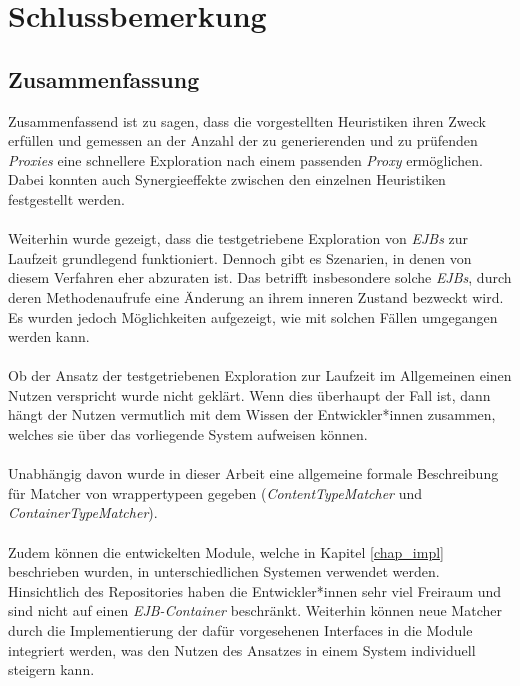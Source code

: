 \chapter{Schlussbemerkung}\label{chap_finish}
\section{Zusammenfassung}
Zusammenfassend ist zu sagen, dass die vorgestellten \Gls{Heuristik}en ihren Zweck erfüllen und gemessen an der Anzahl der zu generierenden und zu prüfenden \emph{Proxies} eine schnellere Exploration nach einem passenden \emph{Proxy} ermöglichen. Dabei konnten auch Synergieeffekte zwischen den einzelnen \Gls{Heuristik}en festgestellt werden.
\\\\
Weiterhin wurde gezeigt, dass die testgetriebene Exploration von \emph{EJBs} zur Laufzeit grundlegend funktioniert. Dennoch gibt es Szenarien, in denen von diesem Verfahren eher abzuraten ist. Das betrifft insbesondere solche \emph{EJBs}, durch deren Methodenaufrufe eine Änderung an ihrem inneren Zustand bezweckt wird. Es wurden jedoch Möglichkeiten aufgezeigt, wie mit solchen Fällen umgegangen werden kann.
\\\\
Ob der Ansatz der testgetriebenen Exploration zur Laufzeit im Allgemeinen einen Nutzen verspricht wurde nicht geklärt. Wenn dies überhaupt der Fall ist, dann hängt der Nutzen vermutlich mit dem Wissen der Entwickler*innen zusammen, welches sie über das vorliegende System aufweisen können.
\\\\
Unabhängig davon wurde in dieser Arbeit eine allgemeine formale Beschreibung für Matcher von \Gls{wrappertype}en gegeben (\emph{ContentTypeMatcher} und \emph{ContainerTypeMatcher}). 
\\\\
Zudem können die entwickelten \Gls{Modul}e, welche in Kapitel \ref{chap_impl} beschrieben wurden, in unterschiedlichen Systemen verwendet werden. Hinsichtlich des Repositories haben die Entwickler*innen sehr viel Freiraum und sind nicht auf einen \emph{EJB-Container} beschränkt. Weiterhin können neue Matcher durch die Implementierung der dafür vorgesehenen \Gls{Interface}s in die \Gls{Modul}e integriert werden, was den Nutzen des Ansatzes in einem System individuell steigern kann.
